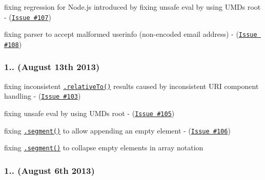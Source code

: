 \begin{DoxyItemize}
\item fixing regression for Node.\+js introduced by {\ttfamily fixing unsafe eval by using U\+MD\textquotesingle{}s root} -\/ (\href{https://github.com/medialize/URI.js/issues/107}{\tt Issue \#107})
\item fixing parser to accept malformed userinfo (non-\/encoded email address) -\/ (\href{https://github.com/medialize/URI.js/issues/108}{\tt Issue \#108})
\end{DoxyItemize}

\subsubsection*{1.. (August 13th 2013)}


\begin{DoxyItemize}
\item fixing inconsistent \href{http://medialize.github.io/URI.js/docs.html#relativeto}{\tt {\ttfamily .relative\+To()}} results caused by inconsistent U\+RI component handling -\/ (\href{https://github.com/medialize/URI.js/issues/103}{\tt Issue \#103})
\item fixing unsafe eval by using U\+MD\textquotesingle{}s root -\/ (\href{https://github.com/medialize/URI.js/issues/105}{\tt Issue \#105})
\item fixing \href{http://medialize.github.io/URI.js/docs.html#accessors-segment}{\tt {\ttfamily .segment()}} to allow appending an empty element -\/ (\href{https://github.com/medialize/URI.js/issues/106}{\tt Issue \#106})
\item fixing \href{http://medialize.github.io/URI.js/docs.html#accessors-segment}{\tt {\ttfamily .segment()}} to collapse empty elements in array notation
\end{DoxyItemize}

\subsubsection*{1.. (August 6th 2013)}


